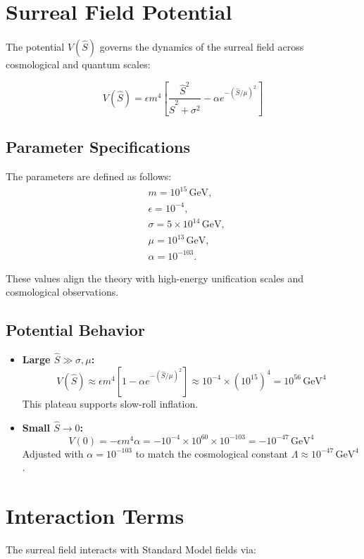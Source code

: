 \documentclass[a4paper,12pt]{article}
\begin{document}
\section{Surreal Field Potential}
The potential \(V(\hat{S})\) governs the dynamics of the surreal field across cosmological and quantum scales:

\[
V(\hat{S}) = \epsilon m^4 \left[ \frac{\hat{S}^2}{\hat{S}^2 + \sigma^2} - \alpha e^{-(\hat{S}/\mu)^2} \right]
\]

\subsection{Parameter Specifications}
The parameters are defined as follows:
\[
\begin{aligned}
    & m = 10^{15} \, \text{GeV}, \\
    & \epsilon = 10^{-4}, \\
    & \sigma = 5 \times 10^{14} \, \text{GeV}, \\
    & \mu = 10^{13} \, \text{GeV}, \\
    & \alpha = 10^{-103}.
\end{aligned}
\]

These values align the theory with high-energy unification scales and cosmological observations.

\subsection{Potential Behavior}
\begin{itemize}
    \item \textbf{Large \(\hat{S} \gg \sigma, \mu\):} 
    \[
    V(\hat{S}) \approx \epsilon m^4 \left[ 1 - \alpha e^{-(\hat{S}/\mu)^2} \right] \approx 10^{-4} \times (10^{15})^4 = 10^{56} \, \text{GeV}^4
    \]
    This plateau supports slow-roll inflation.
    \item \textbf{Small \(\hat{S} \to 0\):} 
    \[
    V(0) = -\epsilon m^4 \alpha = -10^{-4} \times 10^{60} \times 10^{-103} = -10^{-47} \, \text{GeV}^4
    \]
    Adjusted with \(\alpha = 10^{-103}\) to match the cosmological constant \(\Lambda \approx 10^{-47} \, \text{GeV}^4\).
\end{itemize}

\section{Interaction Terms}
The surreal field interacts with Standard Model fields via:
\end{document}
